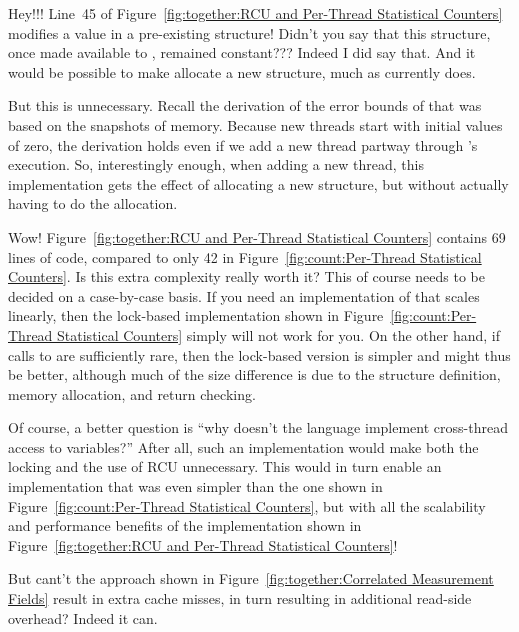 \begin{enumerate}
\QuickQ{}
	Hey!!!
	Line~45 of
	Figure~\ref{fig:together:RCU and Per-Thread Statistical Counters}
	modifies a value in a pre-existing  structure!
	Didn't you say that this structure, once made available to
	, remained constant???
\QuickA{}
	Indeed I did say that.
	And it would be possible to make 
	allocate a new structure, much as 
	currently does.

	But this is unnecessary.
	Recall the derivation of the error bounds of 
	that was based on the snapshots of memory.
	Because new threads start with initial  values of
	zero, the derivation holds even if we add a new thread partway
	through 's execution.
	So, interestingly enough, when adding a new thread, this
	implementation gets the effect of allocating a new structure,
	but without actually having to do the allocation.

\QuickQ{}
	Wow!
	Figure~\ref{fig:together:RCU and Per-Thread Statistical Counters}
	contains 69 lines of code, compared to only 42 in
	Figure~\ref{fig:count:Per-Thread Statistical Counters}.
	Is this extra complexity really worth it?
\QuickA{}
	This of course needs to be decided on a case-by-case basis.
	If you need an implementation of  that
	scales linearly, then the lock-based implementation shown in
	Figure~\ref{fig:count:Per-Thread Statistical Counters}
	simply will not work for you.
	On the other hand, if calls to  are sufficiently
	rare, then the lock-based version is simpler and might thus be
	better, although much of the size difference is due
	to the structure definition, memory allocation, and 
	return checking.

	Of course, a better question is ``why doesn't the language
	implement cross-thread access to  variables?''
	After all, such an implementation would make both the locking
	and the use of RCU unnecessary.
	This would in turn enable an implementation that
	was even simpler than the one shown in
	Figure~\ref{fig:count:Per-Thread Statistical Counters}, but
	with all the scalability and performance benefits of the
	implementation shown in
	Figure~\ref{fig:together:RCU and Per-Thread Statistical Counters}!

\QuickQ{}
	But cant't the approach shown in
	Figure~\ref{fig:together:Correlated Measurement Fields}
	result in extra cache misses, in turn resulting in additional
	read-side overhead?
\QuickA{}
	Indeed it can.


\end{enumerate}
